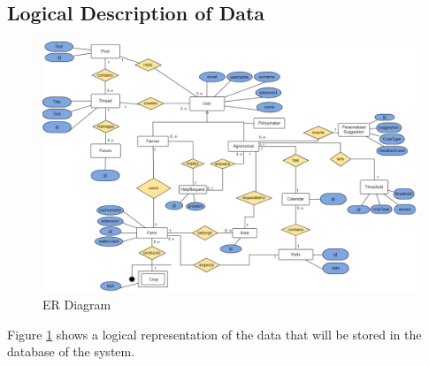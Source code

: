 \subsection{Logical Description of Data}
\begin{figure}[H]
    \includegraphics[width=\textwidth,height=\textheight,keepaspectratio]{Images/erDiagram.png}
    \caption{ER Diagram}
    \label{fig:er_diagram}
\end{figure}
Figure \ref{fig:er_diagram} shows a logical representation of the data that will be stored in the database of the system.
